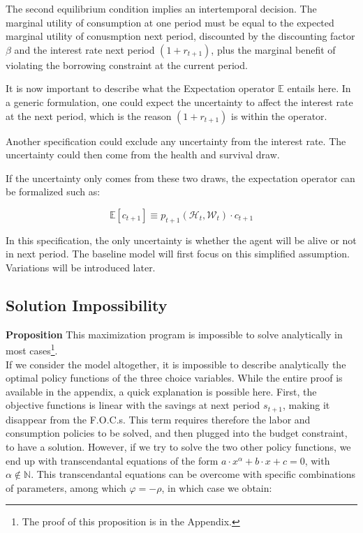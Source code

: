 \documentclass{article}
\begin{document}
The second equilibrium condition implies an intertemporal decision.
The marginal utility of consumption at one period must be equal to the 
expected marginal utility of conusmption next period, discounted by 
the discounting factor $\beta$ and the interest rate next period $(1+r_{t+1})$, 
plus the marginal benefit of violating the borrowing constraint at the current period. 

It is now important to describe what the Expectation operator $\mathbb{E}$ entails here. 
In a generic formulation, one could expect the uncertainty to affect the interest rate at the next period, 
which is the reason $(1+r_{t+1})$ is within the operator.

Another specification could exclude any uncertainty from 
the interest rate. 
The uncertainty could then come from the health and survival draw. 

If the uncertainty only comes from these two draws, the expectation operator can be formalized such as: 

$$\mathbb{E}\left[c_{t+1}\right] \equiv p_{t+1}(\mathcal{H}_{t},\mathcal{W}_{t}) \cdot c_{t+1}$$

In this specification, the only uncertainty is whether the agent will be alive or not in next period.
The baseline model will first focus on this simplified assumption. 
Variations will be introduced later.

\subsection{Solution Impossibility}

\textbf{Proposition}
This maximization program is impossible to solve analytically in most cases\footnote{The proof of this proposition is in the Appendix.}.
\\

If we consider the model altogether, it is impossible to describe 
analytically the optimal policy functions of the three choice variables.
While the entire proof is available in the appendix, a quick explanation
is possible here.
First, the objective functions is linear with the savings at next period $s_{t+1}$, 
making it disappear from the F.O.C.s.
This term requires therefore the labor and consumption policies to be solved, 
and then plugged into the budget constraint, to have a solution. 
However, if we try to solve the two other policy functions, 
we end up with transcendantal equations of the form $a\cdot x^{\alpha} + b\cdot x + c = 0$, 
with $\alpha\notin \mathbb{N}$. 
This transcendantal equations can be overcome with specific combinations 
of parameters, among which $\varphi = -\rho$, in which case we obtain: 
\end{document}
